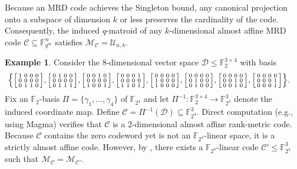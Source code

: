\documentclass[a4paper,11pt,reqno]{article}
\newcommand{\F}{\mathbb{F}}
\newcommand{\M}{\mathcal{M}}
\newcommand{\C}{\mathcal{C}}
\theoremstyle{plain} \numberwithin{equation}{section}
\theoremstyle{definition}
\newtheorem{example}[theorem]{Example}
\begin{document}
{Because an MRD code achieves the Singleton bound, any canonical projection onto a subspace of dimension $k$ or less preserves the cardinality of the code. Consequently, the induced $q$-matroid of any $k$-dimensional almost affine MRD code $\mathcal{C}\subseteq \mathbb{F}_{q^m}^n$ satisfies $\mathcal{M}_{\mathcal{C}} = \mathcal{U}_{n,k}$.}

\begin{example} 
Consider the 8-dimensional vector space $\mathcal{D} \leq \F_2^{3 \times 4}$ with basis
\begin{align*}
\Big\{&\begin{bsmallmatrix}
1 & 0 & 0 & 0 \\
0 & 0 & 0 & 0 \\
0 & 1 & 1 & 0
\end{bsmallmatrix}, 
\begin{bsmallmatrix}
0 & 1 & 0 & 0 \\
0 & 0 & 0 & 0 \\
0 & 1 & 1 & 1
\end{bsmallmatrix}, 
\begin{bsmallmatrix}
0 & 0 & 1 & 0 \\
0 & 0 & 0 & 0 \\
1 & 0 & 0 & 1
\end{bsmallmatrix}, 
\begin{bsmallmatrix}
0 & 0 & 0 & 1 \\
0 & 0 & 0 & 0 \\
1 & 1 & 0 & 1
\end{bsmallmatrix},
\begin{bsmallmatrix}
0 & 0 & 0 & 0 \\
1 & 0 & 0 & 0 \\
1 & 0 & 0 & 0 
\end{bsmallmatrix}, 
\begin{bsmallmatrix}
0 & 0 & 0 & 0 \\
0 & 1 & 0 & 0 \\
0 & 1 & 0 & 0
\end{bsmallmatrix}, 
\begin{bsmallmatrix}
0 & 0 & 0 & 0 \\
0 & 0 & 1 & 0 \\
0 & 0 & 1 & 0
\end{bsmallmatrix}, 
\begin{bsmallmatrix}
0 & 0 & 0 & 0 \\
0 & 0 & 0 & 1 \\
0 & 0 & 0 & 1
\end{bsmallmatrix}\Big\}.
\end{align*}
Fix an $\F_2$-basis $\Pi = \{\gamma_1,\dots,\gamma_4\}$ of $\F_{2^4}$ and let $\Pi^{-1}\colon \F_2^{3\times 4}\rightarrow \F_{2^4}^3$ denote the induced coordinate map. Define $\C = \Pi^{-1}(\mathcal{D})\subseteq \F_{2^4}^3$. Direct computation (e.g., using Magma) verifies that $\C$ is a $2$-dimensional almost affine rank-metric code. Because $\C$ contains the zero codeword yet is not an $\F_{2^4}$-linear space, it is a strictly almost affine code. However, by \cite[Theorem 6.10]{alfarano2026representabilityqmatroidsrankmetriccodes}, there exists a $\F_{2^4}$-linear code $\C'\leq \F_{2^4}^3$ such that $\M_\C = \M_{\C'}$.
\label{exmp:almostaffine}
\end{example}
\end{document}
